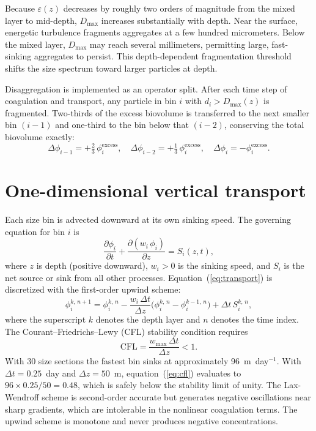 \documentclass[12pt,a4paper]{report}
\numberwithin{equation}{chapter}
\begin{document}
Because $\varepsilon(z)$ decreases by roughly two orders of magnitude from the
mixed layer to mid-depth, $D_\mathrm{max}$ increases substantially with depth.
Near the surface, energetic turbulence fragments aggregates at a few hundred
micrometers. Below the mixed layer, $D_\mathrm{max}$ may reach several
millimeters, permitting large, fast-sinking aggregates to persist. This
depth-dependent fragmentation threshold shifts the size spectrum toward larger
particles at depth.

Disaggregation is implemented as an operator split. After each time step
of coagulation and transport, any particle in bin $i$ with $d_i > D_\mathrm{max}(z)$
is fragmented. Two-thirds of the excess biovolume is transferred to the
next smaller bin $(i-1)$ and one-third to the bin below that $(i-2)$,
conserving the total biovolume exactly:
\begin{equation}
    \Delta\phi_{i-1} = +\tfrac{2}{3}\,\phi_i^\mathrm{excess},
    \quad
    \Delta\phi_{i-2} = +\tfrac{1}{3}\,\phi_i^\mathrm{excess},
    \quad
    \Delta\phi_i     = -\phi_i^\mathrm{excess}.
    \label{eq:disagg_split}
\end{equation}

\section{One-dimensional vertical transport}

Each size bin is advected downward at its own sinking speed. The
governing equation for bin $i$ is
\begin{equation}
    \frac{\partial \phi_i}{\partial t}
    + \frac{\partial (w_i\,\phi_i)}{\partial z}
    = S_i(z, t),
    \label{eq:transport}
\end{equation}
where $z$ is depth (positive downward), $w_i > 0$ is the sinking speed, and
$S_i$ is the net source or sink from all other processes.
Equation~(\ref{eq:transport}) is discretized with the first-order upwind scheme:
\begin{equation}
    \phi_i^{k,\,n+1}
    = \phi_i^{k,\,n}
    - \frac{w_i\,\Delta t}{\Delta z}\bigl(\phi_i^{k,\,n} - \phi_i^{k-1,\,n}\bigr)
    + \Delta t\,S_i^{k,\,n},
    \label{eq:upwind}
\end{equation}
where the superscript $k$ denotes the depth layer and $n$ denotes the time index.
The Courant--Friedrichs--Lewy (CFL) stability condition requires
\begin{equation}
    \mathrm{CFL} = \frac{w_\mathrm{max}\,\Delta t}{\Delta z} < 1.
    \label{eq:cfl}
\end{equation}
With 30 size sections the fastest bin sinks at approximately 96~m~day$^{-1}$.
With $\Delta t = 0.25$~day and $\Delta z = 50$~m,
equation~(\ref{eq:cfl}) evaluates to $96 \times 0.25 / 50 = 0.48$,
which is safely below the stability limit of unity.
The Lax-Wendroff scheme is second-order accurate but generates negative
oscillations near sharp gradients, which are intolerable in the nonlinear
coagulation terms. The upwind scheme is monotone and never produces
negative concentrations.
\end{document}
